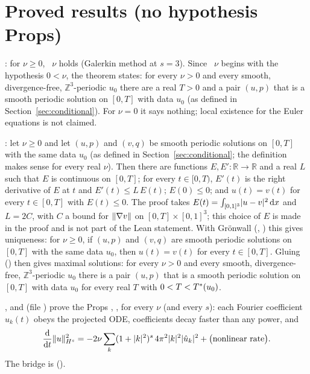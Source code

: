 \documentclass[11pt]{article}
\begin{document}
\section{Proved results (no hypothesis Props)}\label{sec:proved}
\begin{theorem}
\coined: for $\nu\ge0$, ~$\nu$ holds (Galerkin method at $s=3$). Since ~$\nu$ begins with the hypothesis $0<\nu$, the theorem states: for every $\nu>0$ and every smooth, divergence-free, $\mathbb{Z}^3$-periodic $u_0$ there are a real $T>0$ and a pair $(u,p)$ that is a smooth periodic solution on $[0,T]$ with data $u_0$ (as defined in Section~\ref{sec:conditional}). For $\nu=0$ it says nothing; local existence for the Euler equations is not claimed.
\end{theorem}
\begin{theorem}
\coined: let $\nu\ge0$ and let $(u,p)$ and $(v,q)$ be smooth periodic solutions on $[0,T]$ with the same data $u_0$ (as defined in Section~\ref{sec:conditional}; the definition makes sense for every real $\nu$). Then there are functions $E,E'\colon\mathbb{R}\to\mathbb{R}$ and a real $L$ such that $E$ is continuous on $[0,T]$; for every $t\in[0,T)$, $E'(t)$ is the right derivative of $E$ at $t$ and $E'(t)\le L\,E(t)$; $E(0)\le0$; and $u(t)=v(t)$ for every $t\in[0,T]$ with $E(t)\le0$. The proof takes $E(t)=\int_{[0,1]^3}\lvert u-v\rvert^2\,\mathrm{d} x$ and $L=2C$, with $C$ a bound for $\lVert\nabla v\rVert$ on $[0,T]\times[0,1]^3$; this choice of $E$ is made in the proof and is not part of the Lean statement.
With Gr\"onwall (\coined, \coined) this gives uniqueness: for $\nu\ge0$, if $(u,p)$ and $(v,q)$ are smooth periodic solutions on $[0,T]$ with the same data $u_0$, then $u(t)=v(t)$ for every $t\in[0,T]$. Gluing (\coined) then gives maximal solutions: for every $\nu>0$ and every smooth, divergence-free, $\mathbb{Z}^3$-periodic $u_0$ there is a pair $(u,p)$ that is a smooth periodic solution on $[0,T]$ with data $u_0$ for every real $T$ with $0<T<T^{*}(u_0)$.
\end{theorem}
\begin{theorem}
\coined, \coined{} and \coined{} (file ) prove the Props , ,  for every $\nu$ (and every $s$): each Fourier coefficient $\hat u_k(t)$ obeys the projected ODE, coefficients decay faster than any power, and
\begin{equation}\label{eq:hs-identity}
\frac{\mathrm d}{\mathrm dt}\lVert u\rVert_{H^s}^2 = -2\nu\sum_{k}(1+\lvert k\rvert^2)^s\,4\pi^2\lvert k\rvert^2\lvert\hat u_k\rvert^2 + \bigl(\text{nonlinear rate}\bigr).
\end{equation}
The bridge is \coined{} ().
\end{theorem}
\end{document}
